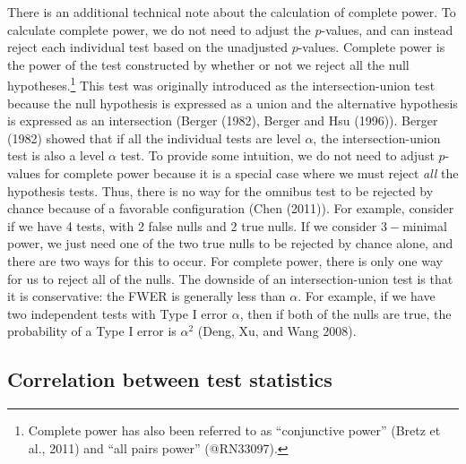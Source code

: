 \documentclass[
]{article}
\begin{document}
There is an additional technical note about the calculation of complete
power. To calculate complete power, we do not need to adjust the
\(p\)-values, and can instead reject each individual test based on the
unadjusted \(p\)-values. Complete power is the power of the test
constructed by whether or not we reject all the null
hypotheses.\footnote{Complete power has also been referred to as “conjunctive power” (Bretz et al., 2011) and “all pairs power” (@RN33097).}
This test was originally introduced as the intersection-union test
because the null hypothesis is expressed as a union and the alternative
hypothesis is expressed as an intersection (Berger (1982), Berger and
Hsu (1996)). Berger (1982) showed that if all the individual tests are
level \(\alpha\), the intersection-union test is also a level \(\alpha\)
test. To provide some intuition, we do not need to adjust \(p\)-values
for complete power because it is a special case where we must reject
\emph{all} the hypothesis tests. Thus, there is no way for the omnibus
test to be rejected by chance because of a favorable configuration (Chen
(2011)). For example, consider if we have 4 tests, with 2 false nulls
and 2 true nulls. If we consider \(3-\)minimal power, we just need one
of the two true nulls to be rejected by chance alone, and there are two
ways for this to occur. For complete power, there is only one way for us
to reject all of the nulls. The downside of an intersection-union test
is that it is conservative: the FWER is generally less than \(\alpha\).
For example, if we have two independent tests with Type I error
\(\alpha\), then if both of the nulls are true, the probability of a
Type I error is \(\alpha^2\) (Deng, Xu, and Wang 2008).

\subsection{Correlation between test statistics}
\label{sec:corr}
\end{document}
